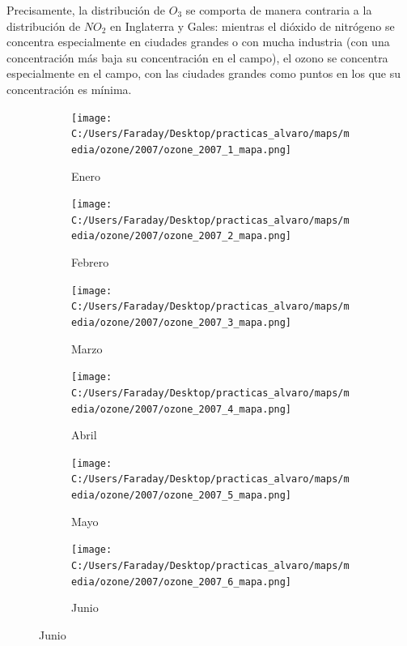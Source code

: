 \documentclass[12pt]{article}
\begin{document}
Precisamente, la distribución de $O_{3}$ se comporta de manera contraria a la distribución de $NO_{2}$ en Inglaterra y Gales: mientras el dióxido de nitrógeno se concentra especialmente en ciudades grandes o con mucha industria (con una concentración más baja su concentración en el campo), el ozono se concentra especialmente en el campo, con las ciudades grandes como puntos en los que su concentración es mínima.

\begin{figure}[H]
\centering
\begin{subfigure}[H]{0.15\textwidth}
\texttt{[image: C:/Users/Faraday/Desktop/practicas\_alvaro/maps/media/ozone/2007/ozone\_2007\_1\_mapa.png]}
\captionsetup{labelformat=empty}
\caption{Enero}
\label{fig:map-ozone-2007-1}
\end{subfigure}
%
\begin{subfigure}[H]{0.15\textwidth}
\texttt{[image: C:/Users/Faraday/Desktop/practicas\_alvaro/maps/media/ozone/2007/ozone\_2007\_2\_mapa.png]}
\captionsetup{labelformat=empty}
\caption{Febrero}
\label{fig:map-ozone-2007-2}
\end{subfigure}
%
\begin{subfigure}[H]{0.15\textwidth}
\texttt{[image: C:/Users/Faraday/Desktop/practicas\_alvaro/maps/media/ozone/2007/ozone\_2007\_3\_mapa.png]}
\captionsetup{labelformat=empty}
\caption{Marzo}
\label{fig:map-ozone-2007-3}
\end{subfigure}
%
\begin{subfigure}[H]{0.15\textwidth}
\texttt{[image: C:/Users/Faraday/Desktop/practicas\_alvaro/maps/media/ozone/2007/ozone\_2007\_4\_mapa.png]}
\captionsetup{labelformat=empty}
\caption{Abril}
\label{fig:map-ozone-2007-4}
\end{subfigure}
%
\begin{subfigure}[H]{0.15\textwidth}
\texttt{[image: C:/Users/Faraday/Desktop/practicas\_alvaro/maps/media/ozone/2007/ozone\_2007\_5\_mapa.png]}
\captionsetup{labelformat=empty}
\caption{Mayo}
\label{fig:map-ozone-2007-5}
\end{subfigure}
%
\begin{subfigure}[H]{0.15\textwidth}
\texttt{[image: C:/Users/Faraday/Desktop/practicas\_alvaro/maps/media/ozone/2007/ozone\_2007\_6\_mapa.png]}
\captionsetup{labelformat=empty}
\caption{Junio}
\label{fig:map-ozone-2007-6}
\end{subfigure}


\end{figure}
\end{document}
